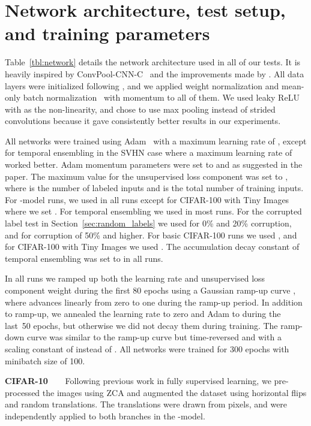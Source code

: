 \documentclass{article}
\begin{document}
\appendix
\section{Network architecture, test setup, and training parameters}
\label{sec:Training parameters}

\newcommand{\wmax}{w_\mathit{max}}
\newcommand{\lmax}{\lambda_\mathit{max}}

Table~\ref{tbl:network} details the network architecture used in all of our tests. It is heavily inspired by 
ConvPool-CNN-C~\citep{springenberg2014} and the improvements made by \cite{Salimans16}. All data layers were 
initialized following \cite{he2015}, and we applied weight normalization and mean-only batch normalization~\citep{Salimans16} 
with momentum  to all of them. We used leaky ReLU~\citep{Maas2013} with  as the non-linearity, and chose
to use max pooling instead of strided convolutions because it gave consistently better results in our experiments. 

All networks were trained using Adam~\citep{adam} with a maximum learning rate of \mbox{}, 
except for temporal ensembling in the SVHN case where a maximum learning rate of \mbox{} worked better. Adam
momentum parameters were set to  and  as suggested in the paper.
The maximum value for the unsupervised loss component was set to , where  is the number of labeled inputs and  is the total number of training inputs.
For -model runs, we used \mbox{} in all runs except for CIFAR-100 with Tiny Images where we set \mbox{}. For temporal ensembling we used \mbox{} in most runs. For the corrupted label test in Section~\ref{sec:random_labels} we used \mbox{} for 0\% and 20\% corruption, and
\mbox{} for corruption of 50\% and higher. For basic CIFAR-100 runs we used \mbox{}, and for CIFAR-100 with Tiny Images we used \mbox{}. The accumulation decay constant 
of temporal ensembling was set to  in all runs.

In all runs we ramped up both the learning rate  and unsupervised loss component weight  during the first 80 epochs
using a Gaussian ramp-up curve , where  advances linearly from zero to one during the ramp-up period.
In addition to ramp-up, we annealed the learning rate  to zero and Adam  to  during the 
last~50 epochs, but otherwise we did not decay them during training. The ramp-down curve was similar
to the ramp-up curve but time-reversed and with a scaling constant of  instead of .
All networks were trained for 300 epochs with minibatch size of 100. 

\textbf{CIFAR-10\ \ \ }
Following previous work in fully supervised learning, we pre-processed the images using ZCA and augmented the dataset using horizontal
flips and random translations. The translations were drawn from  pixels, and were independently applied to both branches in the -model.
\end{document}
